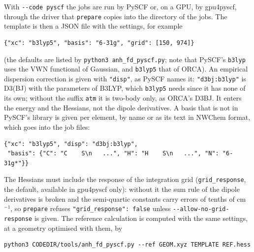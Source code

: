 With \texttt{-{}-code pyscf} the jobs are run by PySCF or, on a GPU,
by gpu4pyscf, through the driver  that
\texttt{prepare} copies into the directory of the jobs. The template is
then a JSON file with the settings, for example
\begin{lstlisting}
{"xc": "b3lyp5", "basis": "6-31g", "grid": [150, 974]}
\end{lstlisting}
(the defaults are listed by \texttt{python3 anh\_fd\_pyscf.py}; note that
PySCF's \texttt{b3lyp} uses the VWN functional of Gaussian, and
\texttt{b3lyp5} that of ORCA). An empirical dispersion correction is
given with \texttt{"disp"}, as PySCF names it: \texttt{"d3bj:b3lyp"} is
D3(BJ) with the parameters of B3LYP, which \texttt{b3lyp5} needs since it
has none of its own; without the suffix \texttt{atm} it is two-body
only, as ORCA's D3BJ. It enters the energy and the Hessians, not the
dipole derivatives. A basis that is not in PySCF's library is given per
element, by name or as its text in NWChem format, which goes into the job
files:
\begin{lstlisting}
{"xc": "b3lyp5", "disp": "d3bj:b3lyp",
 "basis": {"C": "C    S\n   ...", "H": "H    S\n   ...", "N": "6-31g*"}}
\end{lstlisting}
The Hessians must include the response of
the integration grid (\texttt{grid\_response}, the default, available in
gpu4pyscf only): without it the sum rule of the dipole derivatives is
broken and the semi-quartic constants carry errors of tenths of
cm$^{-1}$, so \texttt{prepare} refuses \texttt{"grid\_response": false}
unless \texttt{-{}-allow-no-grid-response} is given. The reference
calculation is computed with the same settings, at a geometry optimised
with them, by
\begin{lstlisting}
python3 CODEDIR/tools/anh_fd_pyscf.py --ref GEOM.xyz TEMPLATE REF.hess
\end{lstlisting}

